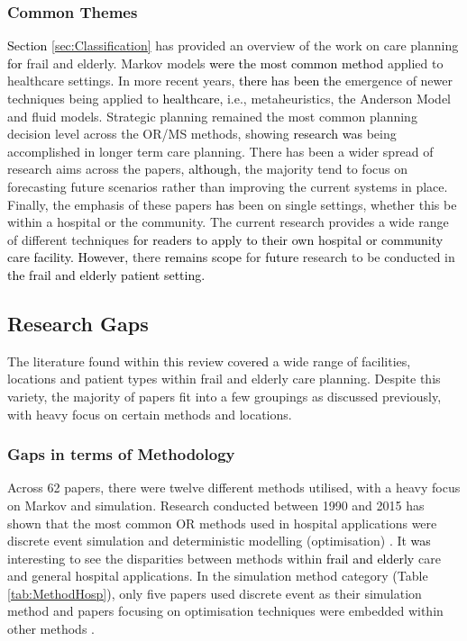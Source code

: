 \documentclass[../thesis.tex]{subfiles}
\begin{document}
\subsubsection{Common Themes}
\textcolor{black}{Section \ref{sec:Classification}} has provided an overview of the work on care planning \textcolor{black}{for} frail and elderly. Markov models \textcolor{black}{were} \textcolor{black}{the most common method} applied to healthcare settings. In more recent years, \textcolor{black}{there has been the }emergence of newer techniques being applied to \textcolor{black}{healthcare,} i.e., metaheuristics, the Anderson Model and fluid models. Strategic planning remained the most common planning decision level across the OR/MS methods, showing \textcolor{black}{research was} being accomplished in longer term care planning. There has been a wider spread of research aims across the papers, \textcolor{black}{although}, the majority tend to focus on forecasting future scenarios rather than improving the current systems in place. Finally\textcolor{black}{,} the emphasis of these papers \textcolor{black}{has} been on single settings, whether this be within a hospital or the community. The current research provides a wide range of different techniques \textcolor{black}{for readers to apply to their own hospital or community care facility. However,} there \textcolor{black}{remains scope} for \textcolor{black}{future} research to be conducted in \textcolor{black}{the frail and elderly patient setting.}

\subsection{Research Gaps} \label{Sec:Research} 
The literature found within this review cover\textcolor{black}{ed} a wide range of facilities, locations and patient types within frail and elderly care planning. Despite this variety, the majority of papers fit into a few groupings as discussed previously, with heavy focus on certain methods and locations.

\subsubsection{Gaps in terms of Methodology}
Across 62 papers, there were twelve different methods utilised, with a heavy focus on Markov and simulation. Research conducted between 1990 and 2015 has shown that the most common OR methods used in hospital applications were discrete event simulation and deterministic modelling (optimisation) \cite{Abe1,Abe2}. It \textcolor{black}{was} interesting to see the disparities between methods within \textcolor{black}{frail and elderly} care and general hospital applications. In the simulation method category \textcolor{black}{(}Table \ref{tab:MethodHosp}\textcolor{black}{)}, only five papers used discrete event as their simulation method \cite{Franck, Katsaliaki, Onggo, Zhang1, Zhang2} and papers focusing on optimisation techniques were embedded within other methods \cite{Bae, Garg1, Lin,Bidhandi, Silvester, Tao, Yalcindag, Zhang2}. 
\end{document}

